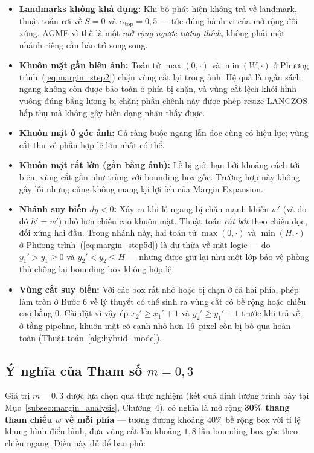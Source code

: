 \begin{itemize}
    \item \textbf{Landmarks không khả dụng:} Khi bộ phát hiện không trả về landmark, thuật toán rơi về $S = 0$ và $\alpha_{\text{top}} = 0{,}5$ --- tức đúng hành vi của mở rộng đối xứng. AGME vì thế là một \textit{mở rộng ngược tương thích}, không phải một nhánh riêng cần bảo trì song song.
    \item \textbf{Khuôn mặt gần biên ảnh:} Toán tử $\max(0,\cdot)$ và $\min(W,\cdot)$ ở Phương trình~(\ref{eq:margin_step2}) chặn vùng cắt lại trong ảnh. Hệ quả là ngân sách ngang không còn được bảo toàn ở phía bị chặn, và vùng cắt lệch khỏi hình vuông đúng bằng lượng bị chặn; phần chênh này được phép resize LANCZOS hấp thụ mà không gây biến dạng nhận thấy được.
    \item \textbf{Khuôn mặt ở góc ảnh:} Cả ràng buộc ngang lẫn dọc cùng có hiệu lực; vùng cắt thu về phần hợp lệ lớn nhất có thể.
    \item \textbf{Khuôn mặt rất lớn (gần bằng ảnh):} Lề bị giới hạn bởi khoảng cách tới biên, vùng cắt gần như trùng với bounding box gốc. Trường hợp này không gây lỗi nhưng cũng không mang lại lợi ích của Margin Expansion.
    \item \textbf{Nhánh suy biến $dy < 0$:} Xảy ra khi lề ngang bị chặn mạnh khiến $w'$ (và do đó $h' = w'$) nhỏ hơn chiều cao khuôn mặt. Thuật toán \textit{cắt bớt} theo chiều dọc, đối xứng hai đầu. Trong nhánh này, hai toán tử $\max(0,\cdot)$ và $\min(H,\cdot)$ ở Phương trình~(\ref{eq:margin_step5d}) là dư thừa về mặt logic --- do $y_1' > y_1 \geq 0$ và $y_2' < y_2 \leq H$ --- nhưng được giữ lại như một lớp bảo vệ phòng thủ chống lại bounding box không hợp lệ.
    \item \textbf{Vùng cắt suy biến:} Với các box rất nhỏ hoặc bị chặn ở cả hai phía, phép làm tròn ở Bước 6 về lý thuyết có thể sinh ra vùng cắt có bề rộng hoặc chiều cao bằng 0. Cài đặt vì vậy ép $x_2' \geq x_1' + 1$ và $y_2' \geq y_1' + 1$ trước khi trả về; ở tầng pipeline, khuôn mặt có cạnh nhỏ hơn 16~pixel còn bị bỏ qua hoàn toàn (Thuật toán~\ref{alg:hybrid_mode}).
\end{itemize}

\subsection{Ý nghĩa của Tham số $m = 0{,}3$}
\label{subsec:margin_value}

Giá trị $m = 0{,}3$ được lựa chọn qua thực nghiệm (kết quả định lượng trình bày tại Mục~\ref{subsec:margin_analysis}, Chương~4), có nghĩa là mở rộng \textbf{30\% thang tham chiếu $w$ về mỗi phía} --- tương đương khoảng $40\%$ bề rộng box với tỉ lệ khung hình điển hình, đưa vùng cắt lên khoảng $1{,}8$ lần bounding box gốc theo chiều ngang. Điều này đủ để bao phủ:

